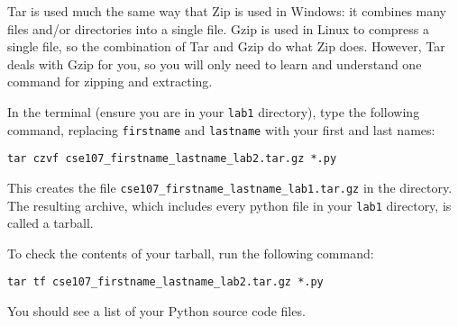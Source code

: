 \documentclass[12pt,hidelinks]{article}
\begin{document}
Tar is used much the same way that Zip is used in Windows: it combines many files and/or directories into a single file. Gzip is used in Linux to compress a single file, so the combination of Tar and Gzip do what Zip does. However, Tar deals with Gzip for you, so you will only need to learn and understand one command for zipping and extracting.

In the terminal (ensure you are in your \texttt{lab1} directory), type the following command, replacing \texttt{firstname} and \texttt{lastname} with your first and last names:

\begin{lstlisting}[style=bash]
tar czvf cse107_firstname_lastname_lab2.tar.gz *.py
\end{lstlisting}

This creates the file \texttt{cse107\_firstname\_lastname\_lab1.tar.gz} in the directory. The resulting archive, which includes every python file in your \texttt{lab1} directory, is called a tarball. 

To check the contents of your tarball, run the following command:

\begin{lstlisting}[style=bash]
tar tf cse107_firstname_lastname_lab2.tar.gz *.py
\end{lstlisting}

You should see a list of your Python source code files.
\end{document}
